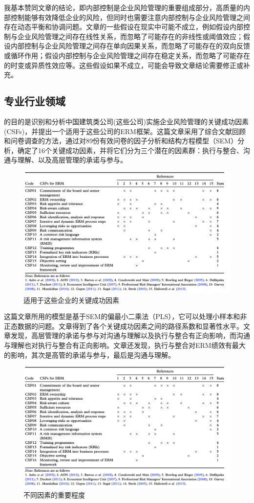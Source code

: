 \documentclass[a4paper,12pt]{ctexart}
\begin{document}
我基本赞同文章的结论，即内部控制是企业风险管理的重要组成部分，高质量的内部控制能够有效降低企业的风险，但同时也需要注意内部控制与企业风险管理之间存在动态平衡和协调问题。文章的一些假设在现实中可能不成立，例如假设内部控制与企业风险管理之间存在线性关系，而忽略了可能存在的非线性或阈值效应；假设内部控制与企业风险管理之间存在单向因果关系，而忽略了可能存在的双向反馈或循环作用；假设内部控制与企业风险管理之间存在稳定关系，而忽略了可能存在的时变或异质性效应等。这些假设如果不成立，可能会导致文章结论需要修正或补充。
\subsection{专业行业领域}
\citet{zhao2013critical}的目的是识别和分析中国建筑类公司(这些公司)实施企业风险管理的关键成功因素(CSFs)，并提出一个适用于这些公司的ERM框架。这篇文章采用了综合文献回顾和问卷调查的方法，通过对89份有效问卷的因子分析和结构方程模型（SEM）分析，确定了16个关键成功因素，并将它们分为三个潜在的因素群：执行与整合、沟通与理解、以及高层管理的承诺与参与。
\begin{figure}[H]
    \caption{适用于这些企业的关键成功因素}
    \centering
    \includegraphics[width=\linewidth]{img/csf.png}
\end{figure}

这篇文章所用的模型是基于SEM的偏最小二乘法（PLS），它可以处理小样本和非正态数据的问题。文章得到了各个关键成功因素之间的路径系数和显著性水平。文章发现，高层管理的承诺与参与对沟通与理解以及执行与整合有正向影响，而沟通与理解也对执行与整合有正向影响。文章还发现，执行与整合对ERM绩效有最大的影响，其次是高管的承诺与参与，最后是沟通与理解。
\begin{figure}[H]
    \caption{不同因素的重要程度}
    \centering
    \includegraphics[width=0.6\linewidth]{img/csf.png}
\end{figure}
\end{document}
